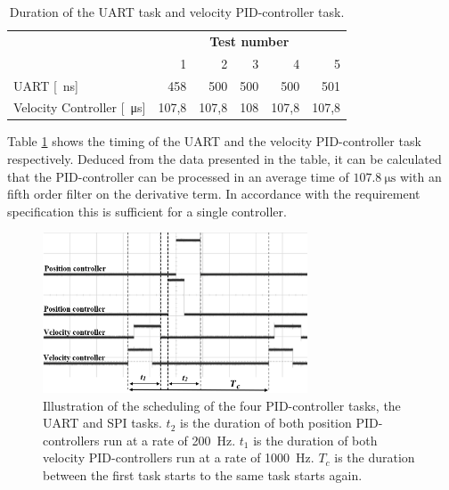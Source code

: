 \documentclass[../../main.tex]{subfiles}
\begin{document}
\begin{table}[H]
\centering
\begin{tabular}{lrrrrr}
\multicolumn{1}{c}{\textbf{}}            & \multicolumn{5}{c}{\textbf{Test number}}                                                                                                 \\
\multicolumn{1}{l|}{}                    & \multicolumn{1}{r|}{1}     & \multicolumn{1}{r|}{2}     & \multicolumn{1}{r|}{3}    & \multicolumn{1}{r|}{4}     & \multicolumn{1}{r}{5} \\ \hline
\multicolumn{1}{l|}{UART [\SI{}{\nano\second}]}                & \multicolumn{1}{r|}{458}   & \multicolumn{1}{r|}{500}   & \multicolumn{1}{r|}{500}  & \multicolumn{1}{r|}{500}   & 501                   \\
\multicolumn{1}{l|}{Velocity Controller [\SI{}{\micro\second}]} & \multicolumn{1}{r|}{107,8} & \multicolumn{1}{r|}{107,8} & \multicolumn{1}{r|}{108}  & \multicolumn{1}{r|}{107,8} & 107,8                
\end{tabular}
\caption{Duration of the  UART task and velocity PID-controller task.}
\label{tab:Task_Timing}
\end{table}

Table \ref{tab:Task_Timing} shows the timing of the UART and the velocity PID-controller task respectively. Deduced from the data presented in the table, it can be calculated that the PID-controller can be processed in an average time of $\SI{107,8}{\micro \second}$ with an fifth order filter on the derivative term. In accordance with the requirement specification this is sufficient for a single controller.
\begin{figure}
    \centering
    \includegraphics[width=0.7\textwidth]{Sections/Test/Images/TestMicrocontrollerTiming.png}
    \caption{Illustration of the scheduling of the four PID-controller tasks, the UART and SPI tasks. $t_2$ is the duration of both position PID-controllers run at a rate of \SI{200}{\hertz}. $t_1$ is the duration of both velocity PID-controllers run at a rate of \SI{1000}{\hertz}.  $T_c$ is the duration between the first task starts to the same task starts again. } 
    \label{fig:Schedueling_controllers}
\end{figure}
\end{document}
